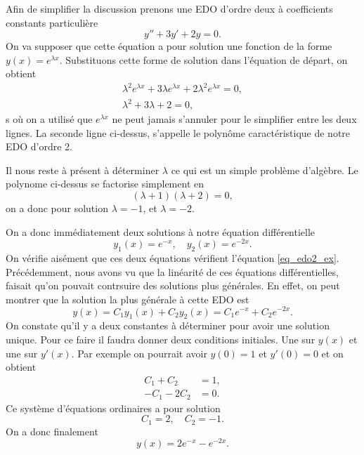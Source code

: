 \documentclass[a4paper,12pt]{book}
\begin{document}
Afin de simplifier la discussion prenons une EDO d'ordre deux à coefficients constants particulière
\begin{equation}
 y''+3y'+2y=0.\label{eq_edo2_ex}
\end{equation}
On va supposer que cette équation a pour solution 
une fonction de la forme $y(x)=e^{\lambda x}$. Substituons cette 
forme de solution dans l'équation de départ, on obtient
\begin{align}
 \lambda^2 e^{\lambda x}+3\lambda e^{\lambda x}+2\lambda^2 e^{\lambda x}=0,\nonumber\\
 \lambda^2+3\lambda +2=0,
\end{align}s
où on a utilisé que $e^{\lambda x}$ ne peut jamais s'annuler pour le simplifier entre les deux lignes. La seconde ligne ci-dessus, s'appelle le polynôme caractéristique de notre EDO d'ordre 2. 

Il nous reste à présent à déterminer $\lambda$ ce qui est un simple problème d'algèbre. 
Le polynome ci-dessus se factorise simplement en
\begin{equation}
 (\lambda+1)(\lambda+2)=0,
\end{equation}
on a donc pour solution $\lambda=-1$, et $\lambda=-2$.

On a donc immédiatement deux solutions à notre équation différentielle
\begin{equation}
 y_1(x)=e^{-x},\quad y_2(x)=e^{-2x}.
\end{equation}
On vérifie aisément que ces deux équations vérifient l'équation \eqref{eq_edo2_ex}.
Précédemment, nous avons vu que la linéarité de ces équations différentielles, faisait
qu'on pouvait contrsuire des solutions plus générales. En effet, on peut montrer que 
la solution la plus générale à cette EDO est
\begin{equation}
 y(x)=C_1 y_1(x)+C_2y_2(x)=C_1e^{-x}+C_2e^{-2x}.
\end{equation}
On constate qu'il y a deux constantes à déterminer pour avoir une solution unique.
Pour ce faire il faudra donner deux conditions initiales. Une sur $y(x)$ et une sur $y'(x)$.
Par exemple on pourrait avoir $y(0)=1$ et $y'(0)=0$ et on obtient
\begin{align}
 C_1+C_2&=1,\\
 -C_1-2C_2&=0.
\end{align}
Ce système d'équations ordinaires a pour solution
\begin{equation}
C_1=2,\quad C_2=-1.
\end{equation}
On a donc finalement
\begin{equation}
 y(x)=2e^{-x}-e^{-2x}.
\end{equation}
\end{document}
